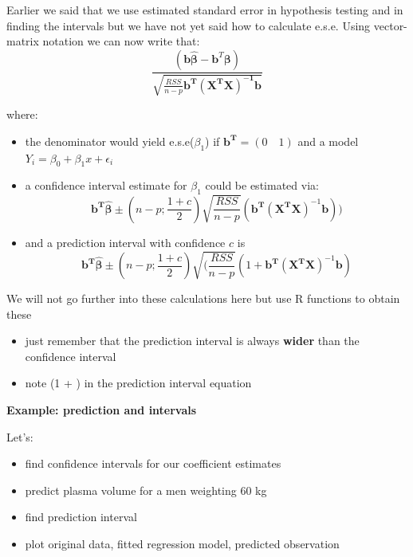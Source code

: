 \documentclass[
]{book}
\providecommand{\tightlist}{%
  \setlength{\itemsep}{0pt}\setlength{\parskip}{0pt}}
\theoremstyle{definition}
\theoremstyle{definition}
\theoremstyle{definition}
\theoremstyle{remark}
\begin{document}
Earlier we said that we use estimated standard error in hypothesis testing and in finding the intervals but we have not yet said how to calculate e.s.e. Using vector-matrix notation we can now write that:
\[\frac{(\mathbf{b}\hat{{\boldsymbol\beta}}-\mathbf{b}^T\boldsymbol\beta)}{\sqrt{\frac{RSS}{n-p}\mathbf{b^T(X^TX)^{-1}b}}}\]

where:

\begin{itemize}
\item
  the denominator would yield e.s.e(\(\beta_1\)) if \(\mathbf{b^T}=(0 \quad 1)\) and a model \(Y_i = \beta_0 + \beta_1x + \epsilon_i\)
\item
  a confidence interval estimate for \(\beta_1\) could be estimated via:
  \[\mathbf{b^T}\hat{\boldsymbol\beta} \pm (n-p; \frac{1+c}{2})\sqrt{\frac{RSS}{n-p}}(\mathbf{b^T}(\mathbf{X^T}\mathbf{X})^{-1}\mathbf{b}))\]
\item
  and a prediction interval with confidence \(c\) is
  \[\mathbf{b^T}\hat{\boldsymbol\beta} \pm (n-p; \frac{1+c}{2})\sqrt{(\frac{RSS}{n-p}}(1+\mathbf{b^T}(\mathbf{X^T}\mathbf{X})^{-1}\mathbf{b})\]
\end{itemize}

We will not go further into these calculations here but use R functions to obtain these

\begin{itemize}
\tightlist
\item
  just remember that the prediction interval is always \textbf{wider} than the confidence interval
\item
  note (1 + ) in the prediction interval equation
\end{itemize}

\textbf{Example: prediction and intervals}

Let's:

\begin{itemize}
\tightlist
\item
  find confidence intervals for our coefficient estimates
\item
  predict plasma volume for a men weighting 60 kg
\item
  find prediction interval
\item
  plot original data, fitted regression model, predicted observation
\end{itemize}
\end{document}
